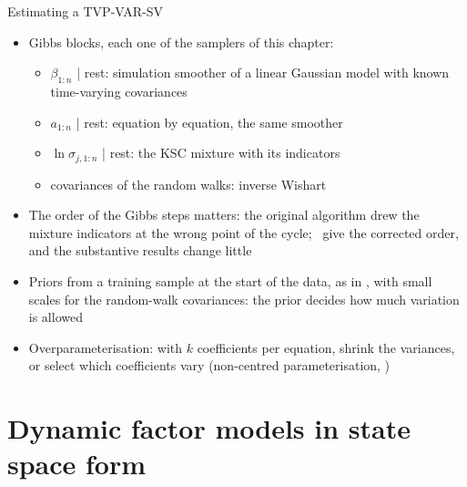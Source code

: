 \begin{frame}{Estimating a TVP-VAR-SV}
\itemsize{\small}
\begin{itemize}
    \item Gibbs blocks, each one of the samplers of this chapter:
    \begin{itemize}
        \item $\beta_{1:n}$ | rest: simulation smoother of a linear Gaussian model with known time-varying covariances
        \item $a_{1:n}$ | rest: equation by equation, the same smoother
        \item $\ln\sigma_{j,1:n}$ | rest: the KSC mixture with its indicators
        \item covariances of the random walks: inverse Wishart
    \end{itemize}
    \item The order of the Gibbs steps matters: the original algorithm drew the mixture indicators at the wrong point of the cycle; \ give the corrected order, and the substantive results change little
    \item Priors from a training sample at the start of the data, as in , with small scales for the random-walk covariances: the prior decides how much variation is allowed
    \item Overparameterisation: with $k$ coefficients per equation, shrink the variances, or select which coefficients vary (non-centred parameterisation, )
\end{itemize}
\end{frame}


\section{Dynamic factor models in state space form}

